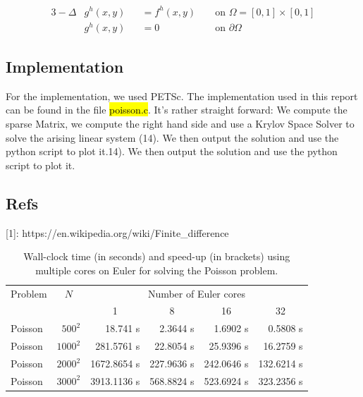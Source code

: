 \documentclass[unicode,11pt,a4paper,oneside,numbers=endperiod,openany]{scrartcl}
\begin{document}
\begin{alignat}{3}
  -\Delta &g^h(x, y) &&= f^h(x, y) &&\text{  on  } \Omega = [0,1] \times [0,1]\\
          &g^h(x, y) &&= 0 &&\text{  on  } \partial \Omega
\end{alignat}

\subsection{Implementation}
For the implementation, we used PETSc. The implementation used in this report can be
found in the file \hl{poisson.c}. It's rather straight forward: We compute the
sparse Matrix, we compute the right hand side and use a Krylov Space Solver
to solve the arising linear system (14). We then output the solution and use
the python script to plot it.14). We then output the solution and use
the python script to plot it.

\subsection{Refs}
[1]: https://en.wikipedia.org/wiki/Finite\_difference


\begin{table}[h]
	\caption{Wall-clock time (in seconds) and speed-up (in brackets) using multiple cores on Euler for solving the Poisson problem.}
	\centering
	
	\begin{tabular}{l|r||r|r|r|r}\hline\hline
		Problem & \multicolumn{1}{c||}{$N$} &  \multicolumn{4}{c}{Number of Euler cores} \\
		&       & \multicolumn{1}{c|}{1} & \multicolumn{1}{c|}{8} & \multicolumn{1}{c|}{16} & \multicolumn{1}{c}{32} \\
		\hline\hline
		{ Poisson} & $500^2$  & 18.741 s   \phantom{222222}       & 2.3644 s   \phantom{222222}      & 1.6902 s \phantom{222222}         &   0.5808 s    \phantom{222222} \\
		{ Poisson} & $1000^2$ & 281.5761 s           &  22.8054 s        & 25.9396 s         & 16.2759 s      \\
		{ Poisson} & $2000^2$ & 1672.8654 s          &  227.9636 s        & 242.0646 s         & 132.6214 s      \\
		{ Poisson} & $3000^2$ & 3913.1136 s           & 568.8824 s        & 523.6924 s         & 323.2356 s      \\\hline \hline
	\end{tabular}
	
	\label{tab:PDEparallel1}
\end{table}
\end{document}
